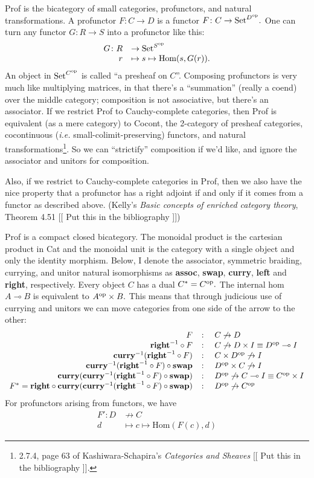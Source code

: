 \documentclass[12pt,twoside,openright]{report}
\newcommand{\Set}{\mathrm{Set}}
\newcommand{\maps}{\colon}
\newcommand{\lhom}{\multimap}
\newcommand{\op}{{\rm op}}
\newcommand{\mbold}[1]{\mbox{\bf #1}}
\newcommand{\Hom}{\mbox{Hom}}
\begin{document}
Prof is the bicategory of small categories, profunctors, and natural transformations.  A profunctor $F\maps C \to D$ is a functor $F\maps C \to \Set^{D^{\op}}.$  One can turn any functor $G\maps R \to S$ into a profunctor like this:
\[ \begin{array}{rl}G\maps R &\to \Set^{S^{\op}} \\ r & \mapsto s \mapsto \Hom(s, G(r)).\end{array} \]
An object in $\Set^{C^{\op}}$ is called ``a presheaf on $C$''.  Composing profunctors is very much like multiplying matrices, in that there's a ``summation'' (really a coend) over the middle category; composition is not associative, but there's an associator.  If we restrict Prof to Cauchy-complete categories, then Prof is equivalent (as a mere category) to Cocont, the 2-category of presheaf categories, cocontinuous ({\em i.e.} small-colimit-preserving) functors, and natural transformations\footnote{2.7.4, page 63 of Kashiwara-Schapira's {\em Categories and Sheaves} [[ Put this in the bibliography ]].}.  So we can ``strictify'' composition if we'd like, and ignore the associator and unitors for composition.

Also, if we restrict to Cauchy-complete categories in Prof, then we also have the nice property that a profunctor has a right adjoint if and only if it comes from a functor as described above.  (Kelly's {\em Basic concepts of enriched category theory}, Theorem 4.51 [[ Put this in the bibliography ]])

Prof is a compact closed bicategory.  The monoidal product is the cartesian product in Cat and the monoidal unit is the category with a single object and only the identity morphism.  Below, I denote the associator, symmetric braiding, currying, and unitor natural isomorphisms as \textbf{assoc}, \textbf{swap}, \textbf{curry}, \textbf{left} and \textbf{right}, respectively.  Every object $C$ has a dual $C^* = C^{\op}.$  The internal hom $A \lhom B$ is equivalent to $A^{\op} \times B.$  This means that through judicious use of currying and unitors we can move categories from one side of the arrow to the other:
\[ \begin{array}{rcl}
  F& \maps & C \not\to D \\
  \mbold{right}^{-1} \circ F& \maps & C \not\to D \times I \equiv D^{\op} \lhom I \\
  \mbold{curry}^{-1}(\mbold{right}^{-1} \circ F)& \maps & C \times D^{\op} \not\to I \\
  \mbold{curry}^{-1}(\mbold{right}^{-1} \circ F) \circ \mbold{swap}& \maps & D^{\op} \times C \not\to I \\
  \mbold{curry}(\mbold{curry}^{-1}(\mbold{right}^{-1} \circ F) \circ \mbold{swap})& \maps & D^{\op} \not\to C \lhom I \equiv C^{\op} \times I \\
  F^* = \mbold{right} \circ \mbold{curry}(\mbold{curry}^{-1}(\mbold{right}^{-1} \circ F) \circ \mbold{swap})& \maps & D^{\op} \not\to C^{\op}
\end{array} \]
For profunctors arising from functors, we have
\[ \begin{array}{rl}F'\maps D &\not\to C \\ d &\mapsto c \mapsto \Hom(F(c), d)\end{array} \]
\end{document}
